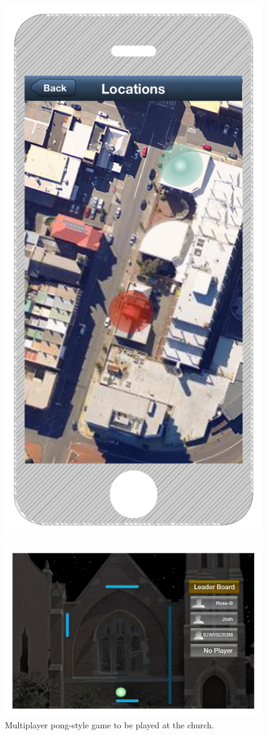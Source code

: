\documentclass[a4paper,12pt]{article}
\begin{document}
\begin{figure}
\begin{minipage}{.5\textwidth}
  \includegraphics[width=.6\linewidth]{./images/iphone-interface-map}
  \label{iphone-interface-map}
\end{minipage}
\end{figure}

\begin{figure}[ht!]
	\centering
	\includegraphics[width=125mm]{./images/MultiPlayerChurchGame}
	\caption{Multiplayer pong-style game to be played at the church.}
	\label{application-multiPlyerPong}
\end{figure}
\end{document}
